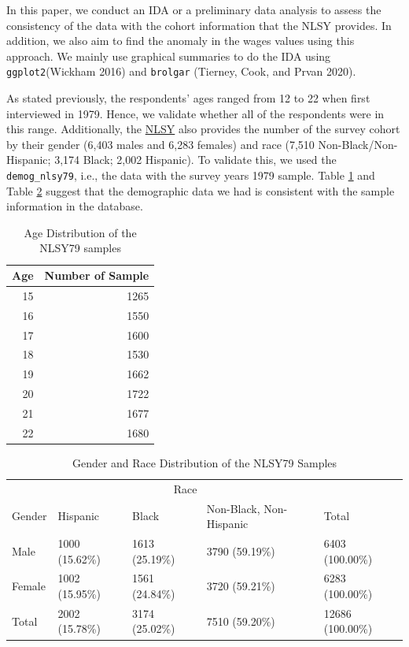 \documentclass{article}
\begin{document}
In this paper, we conduct an IDA or a preliminary data analysis to assess the consistency of the data with the cohort information that the NLSY provides. In addition, we also aim to find the anomaly in the wages values using this approach. We mainly use graphical summaries to do the IDA using \texttt{ggplot2}(Wickham 2016) and \texttt{brolgar} (Tierney, Cook, and Prvan 2020).

As stated previously, the respondents' ages ranged from 12 to 22 when first interviewed in 1979. Hence, we validate whether all of the respondents were in this range. Additionally, the \href{https://www.nlsinfo.org/content/cohorts/nlsy79/intro-to-the-sample/nlsy79-sample-introduction}{NLSY} also provides the number of the survey cohort by their gender (6,403 males and 6,283 females) and race (7,510 Non-Black/Non-Hispanic; 3,174 Black; 2,002 Hispanic). To validate this, we used the \texttt{demog\_nlsy79}, i.e., the data with the survey years 1979 sample. Table \ref{tab:age-table} and Table \ref{tab:gender-race-table} suggest that the demographic data we had is consistent with the sample information in the database.

\begin{table}

\caption{\label{tab:age-table}Age Distribution of the NLSY79 samples}
\centering
\begin{tabular}[t]{r|r}
\hline
Age & Number of Sample\\
\hline
15 & 1265\\
\hline
16 & 1550\\
\hline
17 & 1600\\
\hline
18 & 1530\\
\hline
19 & 1662\\
\hline
20 & 1722\\
\hline
21 & 1677\\
\hline
22 & 1680\\
\hline
\end{tabular}
\end{table}

\begin{table}

\caption{\label{tab:gender-race-table}Gender and Race Distribution of the NLSY79 Samples}
\centering
\begin{tabular}[t]{l|l|l|l|l}
\hline
\multicolumn{1}{c|}{ } & \multicolumn{3}{c|}{Race} & \multicolumn{1}{c}{ } \\
\cline{2-4}
Gender & Hispanic & Black & Non-Black, Non-Hispanic & Total\\
\hline
Male & 1000 (15.62\%) & 1613 (25.19\%) & 3790 (59.19\%) & 6403 (100.00\%)\\
\hline
Female & 1002 (15.95\%) & 1561 (24.84\%) & 3720 (59.21\%) & 6283 (100.00\%)\\
\hline
Total & 2002 (15.78\%) & 3174 (25.02\%) & 7510 (59.20\%) & 12686 (100.00\%)\\
\hline
\end{tabular}
\end{table}
\end{document}
